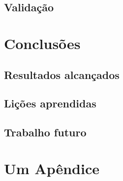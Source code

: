 \documentclass[11pt,a4paper]{report}
\begin{document}
\section{Validação}

\chapter{Conclusões}

\section{Resultados alcançados}


\section{Lições aprendidas}

\section{Trabalho futuro}



\renewcommand{\bibname}{Referências bibliográficas}
\printbibliography
{}  %


\appendix
\chapter{Um Apêndice}

\end{document}
